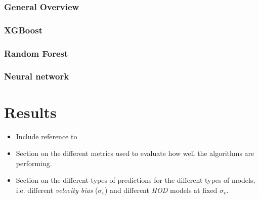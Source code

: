 \documentclass[useAMS,usenatbib, usedcolumn]{mnras}
\begin{document}
\subsubsection{General Overview}
\label{subsub:ml_gen_overview}



\subsubsection{XGBoost}
\label{subsub:ml_xgboost}



\subsubsection{Random Forest}
\label{subsub:ml_random_forest}



\subsubsection{Neural network}
\label{subsub:ml_neural_network}





\section{Results}
\label{sec:results}

\begin{itemize}[leftmargin=0.5\parindent, labelsep=0.5\parindent]
    \item
    Include reference to \citet{Ivezic2014}

    \item
    Section on the different metrics used to evaluate how well the
    algorithms are performing.

    \item
    Section on the different types of predictions for the different
    types of models, i.e. different \textit{velocity bias} ($\sigma_{v}$)
    and different \textit{HOD} models at fixed $\sigma_{v}$.
\end{itemize}
\end{document}
